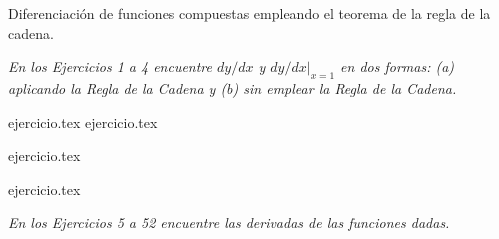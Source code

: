 
Diferenciación de funciones compuestas empleando el teorema de la regla de la cadena.

\noindent \textit{En los Ejercicios 1 a 4 encuentre $dy/dx$ y $dy/dx|_{x=1}$ en dos formas: (a) aplicando la Regla de la Cadena y (b) sin emplear la Regla de la Cadena.}

\begin{enumerate}
    \begin{minipage}{0.45\textwidth}
    {ejercicio.tex}
    {ejercicio.tex}
    \end{minipage}%
    \begin{minipage}{0.45\textwidth}
    \setcounter{enumi}{1}
    {ejercicio.tex}
    \addtocounter{enumi}{1}
    {ejercicio.tex}
    \end{minipage}
\end{enumerate}

\noindent \textit{En los Ejercicios 5 a 52 encuentre las derivadas de las funciones dadas.}

